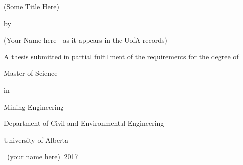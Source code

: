 \begin{SingleSpace}

    \begin{center}
        \thispagestyle{empty}

        \vspace*{4\baselineskip}
        (Some Title Here)
        \vspace*{1\baselineskip}

        by
        \vspace*{1\baselineskip}

        (Your Name here - as it appears in the UofA records)
        \vspace*{6\baselineskip}

        A thesis submitted in partial fulfillment of the requirements for the degree of
        \vspace*{2\baselineskip}

        Master of Science
        \vspace*{1\baselineskip}

        in
        \vspace*{1\baselineskip}

        Mining Engineering
        \vspace*{5\baselineskip}

        Department of Civil and Environmental Engineering

        University of Alberta
        \vspace*{10\baselineskip}

        \textcopyright\ (your name here), 2017

    \end{center}

\end{SingleSpace}
